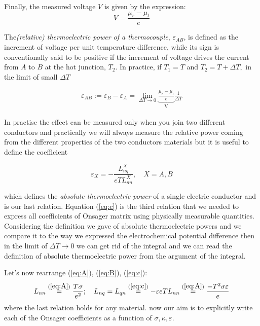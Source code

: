 \documentclass[\main/main.tex]{subfiles}
\begin{document}
\begin{enumerate}
Finally, the measured voltage $V$ is given by the expression:
\begin{equation}
    V=\frac{\mu_r-\mu_l}{e}
\end{equation}

The\textit{(relative) thermoelectric power of a thermocouple}, $\varepsilon_{A B}$, is defined as the increment of voltage per unit temperature difference, while its sign is conventionally said to be positive if the increment of voltage drives the current from $A$ to $B$ at the hot junction, $T_{2} .$ In practice, if $T_{1}=T$ and $T_{2}=T+\Delta T,$ in the limit of small $\Delta T$

\begin{align}
    \varepsilon_{A B}:= \varepsilon_{B}-\varepsilon_{A}=\lim_{\Delta T\to 0}
    \underbrace{\frac{\mu_r-\mu_l}{e}}_{\text{V}} \frac{1}{\Delta T} 
\end{align}


In practise the effect can be measured only when you join two different conductors and practically we will always measure the relative power coming from the different properties of the two conductors materials but it is useful to define the coefficient 

\begin{equation}
    \boxed{\varepsilon_{X}=-\frac{L_{n q}^{X}}{e T L_{n n}^{X}}, \quad X=A, B}
    \label{eq:c}
\end{equation}

which defines the\textit{ absolute thermoelectric power} of a single electric conductor and is our last relation. Equation (\ref{eq:c}) is the third relation that we needed to express all coefficients of Onsager matrix using physically measurable quantities. \\

Considering the definition we gave of absolute thermoelectric powers and we compare it to the  way we expressed the electrochemical potential difference then in the limit of $\Delta T\to 0$ we can get rid of the integral and we can read the definition of absolute thermoelectric power from the argument of the integral. 
\end{enumerate}

Let's now rearrange (\ref{eq:A}), (\ref{eq:B}), (\ref{eq:c}):
\begin{equation}
    L_{nn}\overset{(\ref{eq:A})}{=}\frac{T\sigma}{e^2}; \quad L_{nq}=L_{qn}\overset{(\ref{eq:c})}{=}-\varepsilon eTL_{nn}\overset{(\ref{eq:A})}{=}\frac{-T^2\sigma\varepsilon}{e}
\end{equation}
 where the last relation holds for any material.
 now our aim is to explicitly write each of the Onsager coefficients as a function of $\sigma,\kappa,\varepsilon$. 
 
\end{document}
